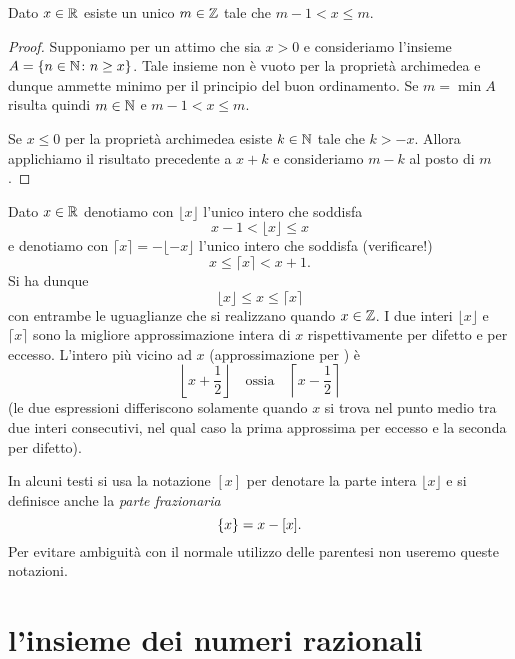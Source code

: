 \begin{theorem}
\mymark{*}%
  Dato $x\in {\mathbb R}$ esiste un unico $m\in {\mathbb Z}$ tale che $m-1 < x \le m$.
\end{theorem}
%
\begin{proof}
  Supponiamo per un attimo che sia $x > 0$
  e consideriamo l'insieme $A={\left\{ n \in {\mathbb N} \colon n\ge x \right\}}$.
  Tale insieme non è vuoto per la proprietà archimedea 
  e dunque ammette minimo per il principio del buon ordinamento.
  Se $m=\min A$ risulta quindi $m\in {\mathbb N}$ e $m-1< x \le m$.

  Se $x\le 0$ per la proprietà archimedea esiste $k\in {\mathbb N}$ tale che 
  $k>-x$. Allora applichiamo il risultato precedente a $x+k$ e consideriamo 
  $m-k$ al posto di $m$.
\end{proof}

\begin{definition}
  \mymark{**}%
  Dato $x\in {\mathbb R}$ denotiamo con $\lfloor x\rfloor$ l'unico intero
  che soddisfa
  \mynote{$\lfloor\cdot\rfloor$} %
  \[
    x - 1 < \lfloor x \rfloor \le x
  \]
  e denotiamo con $\lceil x \rceil = - \lfloor -x \rfloor$ l'unico intero che soddisfa (verificare!)
  \mynote{$\lceil\cdot\rceil$} %
  \[
    x \le \lceil x \rceil < x + 1.
  \]
  Si ha dunque
  \[
    \lfloor x \rfloor \le x \le \lceil x \rceil
  \]
  con entrambe le uguaglianze che si realizzano quando $x\in {\mathbb Z}$.
  I due interi $\lfloor x \rfloor$ e $\lceil x \rceil$
  sono la migliore approssimazione intera di $x$ rispettivamente
  per difetto e per eccesso.
  L'intero più vicino ad $x$ (approssimazione per )
  è
%
  \[
    \left\lfloor x + \frac 1 2 \right\rfloor
  \quad \text{ossia} \quad
    \left\lceil x-\frac 1 2 \right\rceil
  \]
  (le due espressioni differiscono solamente quando $x$ si trova nel punto medio tra 
  due interi consecutivi, nel qual caso la prima approssima per eccesso e la seconda 
  per difetto).
\end{definition}

In alcuni testi si usa la notazione $[x]$ per denotare la parte intera $\lfloor x \rfloor$ e si definisce
anche la \emph{parte frazionaria}
\[
  {\left\{ x \right\}} = x - [x].
\]
Per evitare ambiguità con il normale utilizzo delle parentesi
non useremo queste notazioni.
  
\section{l'insieme dei numeri razionali}

